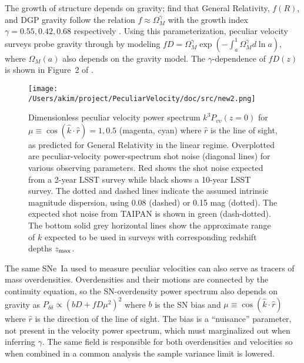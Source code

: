 The  growth of structure depends on gravity;
\citet{PhysRevD.72.043529,2007APh....28..481L} find that General Relativity, $f(R)$,  and DGP gravity follow the relation
$f \approx \Omega_M^\gamma$ with the growth index $\gamma=0.55, 0.42, 0.68$ respectively \citep[see][for a review
or these  models]{HUTERER201523}.  
Using this parameterization, peculiar velocity
surveys probe  gravity through by modeling $fD=\Omega_M^{\gamma} \exp{\left(-\int_a^1 \Omega_M^{\gamma} d\ln{a} \right)}$,
where $\Omega_M(a)$ also depends on the gravity model.
The  $\gamma$-dependence of $fD(z)$ is shown 
in Figure~2 of  \citet{1475-7516-2013-04-031}.

%


\begin{figure}[h]
\centering
\texttt{[image: /Users/akim/project/PeculiarVelocity/doc/src/new2.png]}
\caption{Dimensionless peculiar velocity power spectrum $k^3P_{vv}(z=0)$ for $\mu \equiv \cos{(\hat{k} \cdot \hat{r})}=1, 0.5$ (magenta, cyan) 
where $\hat{r}$ is the line of sight, as predicted for General Relativity in the linear regime.
Overplotted are peculiar-velocity power-spectrum shot noise  (diagonal lines) for various observing parameters.  Red shows the shot noise expected from a 2-year LSST survey
while black shows a 10-year LSST survey.  The dotted and dashed lines indicate the assumed intrinsic magnitude dispersion, using 0.08 (dashed) or 0.15 mag (dotted).  The expected shot
noise from TAIPAN is shown in green (dash-dotted). 
%
The bottom solid grey horizontal lines show the approximate range of $k$ expected to be used in surveys with corresponding
redshift depths $z_{\rm max}$.
\label{power:fig}}
\end{figure}

The same SNe~Ia used  to measure peculiar velocities can also serve as tracers of mass overdensities.  Overdensities and their motions are connected by the
continuity equation, so the SN-overdensity power spectrum also depends on gravity 
as $P_{\delta \delta }\propto (bD + fD\mu^2)^2$ where $b$ is the SN bias and $\mu\equiv \cos{(\hat{k} \cdot \hat{r})}$ where $\hat{r}$ is the direction of
the line of sight.  
The bias is a ``nuisance'' parameter, not present in the velocity power spectrum, which must marginalized out when inferring $\gamma$.
The same field is responsible for both overdensities and velocities so when combined in a common analysis the sample variance limit is lowered.



